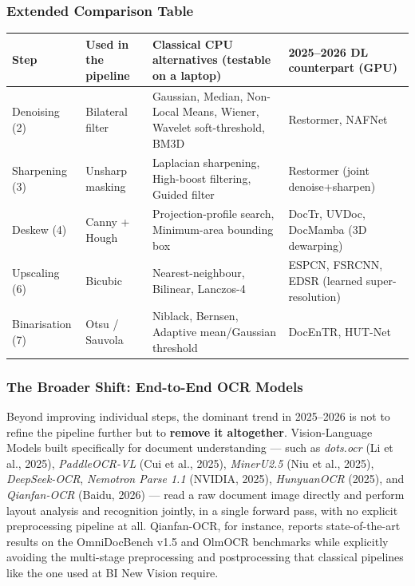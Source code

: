 \documentclass[12pt, a4paper]{article}
\begin{document}
\subsubsection*{Extended Comparison Table}

\vspace{0.5em}
\begin{tabularx}{\textwidth}{lXXX}
\toprule
\textbf{Step} & \textbf{Used in the pipeline} & \textbf{Classical CPU alternatives (testable on a laptop)} & \textbf{2025--2026 DL counterpart (GPU)} \\
\midrule
Denoising (2) & Bilateral filter & Gaussian, Median, Non-Local Means, Wiener, Wavelet soft-threshold, BM3D & Restormer, NAFNet \\
\addlinespace
Sharpening (3) & Unsharp masking & Laplacian sharpening, High-boost filtering, Guided filter & Restormer (joint denoise+sharpen) \\
\addlinespace
Deskew (4) & Canny + Hough & Projection-profile search, Minimum-area bounding box & DocTr, UVDoc, DocMamba (3D dewarping) \\
\addlinespace
Upscaling (6) & Bicubic & Nearest-neighbour, Bilinear, Lanczos-4 & ESPCN, FSRCNN, EDSR (learned super-resolution) \\
\addlinespace
Binarisation (7) & Otsu / Sauvola & Niblack, Bernsen, Adaptive mean/Gaussian threshold & DocEnTR, HUT-Net \\
\bottomrule
\end{tabularx}

\vspace{1em}

\subsubsection*{The Broader Shift: End-to-End OCR Models}

Beyond improving individual steps, the dominant trend in 2025--2026 is not to refine the pipeline further but to \textbf{remove it altogether}. Vision-Language Models built specifically for document understanding --- such as \textit{dots.ocr} (Li et al., 2025), \textit{PaddleOCR-VL} (Cui et al., 2025), \textit{MinerU2.5} (Niu et al., 2025), \textit{DeepSeek-OCR}, \textit{Nemotron Parse 1.1} (NVIDIA, 2025), \textit{HunyuanOCR} (2025), and \textit{Qianfan-OCR} (Baidu, 2026) --- read a raw document image directly and perform layout analysis and recognition jointly, in a single forward pass, with no explicit preprocessing pipeline at all. Qianfan-OCR, for instance, reports state-of-the-art results on the OmniDocBench v1.5 and OlmOCR benchmarks while explicitly avoiding the multi-stage preprocessing and postprocessing that classical pipelines like the one used at BI New Vision require.
\end{document}
